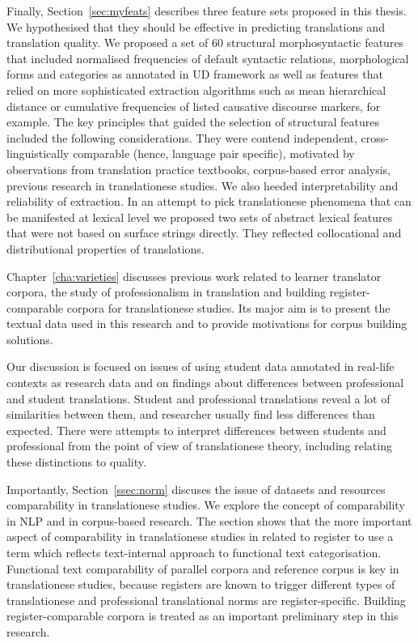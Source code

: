 Finally, Section~\ref{sec:myfeats} describes three feature sets proposed in this thesis. We hypothesised that they should be effective in predicting translations and translation quality. We proposed a set of 60 structural morphosyntactic features that included normalised frequencies of default syntactic relations, morphological forms and categories as annotated in \gls{UD} framework as well as features that relied on more sophisticated extraction algorithms such as mean hierarchical distance or cumulative frequencies of listed causative discourse markers, for example. 
The key principles that guided the selection of structural features included the following considerations. They were contend independent, cross-linguistically comparable (hence, language pair specific), motivated by observations from translation practice textbooks, corpus-based error analysis, previous research in translationese studies. We also heeded interpretability and reliability of extraction.
In an attempt to pick translationese phenomena that can be manifested at lexical level we proposed two sets of abstract lexical features that were not based on surface strings directly. They reflected collocational and distributional properties of translations. 

Chapter~\ref{cha:varieties} discusses previous work related to learner translator corpora, the study of professionalism in translation and building register-comparable corpora for translationese studies. Its major aim is to present the textual data used in this research and to provide motivations for corpus building solutions.

Our discussion is focused on issues of using student data annotated in real-life contexts as research data and on findings about differences between professional and student translations. Student and professional translations reveal a lot of similarities between them, and researcher usually find less differences than expected. 
There were attempts to interpret differences between students and professional from the point of view of translationese theory, including relating these distinctions to quality. 
 
Importantly, Section~\ref{ssec:norm} discuses the issue of datasets and resources comparability in translationese studies. We explore the concept of comparability in NLP and in corpus-based research. The section shows that the more important aspect of comparability in translationese studies in related to register to use a term which reflects text-internal approach to functional text categorisation. Functional text comparability of parallel corpora and reference corpus is key in translationese studies, because registers are known to trigger different types of translationese and  professional translational norms are register-specific. Building register-comparable corpora is treated as an important preliminary step in this research. 

